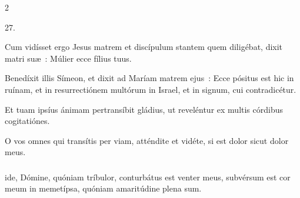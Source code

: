 \documentclass[9pt,twoside]{extarticle}
\begin{document}
\begin{multicols}{2}
{{\begin{tightlist}{}
\item {} 27.
\item {} Cum vidísset ergo Jesus matrem et discípulum stantem quem diligébat, dixit matri suæ~: Múlier ecce fílius tuus.
\item {} Benedíxit illis Símeon, et dixit ad Maríam matrem ejus~: Ecce pósitus est hic in ruínam, et in resurrectiónem multórum in Israel, et in signum, cui contradicétur.
\item {} Et tuam ipsíus ánimam pertransíbit gládius, ut reveléntur ex multis córdibus cogitatiónes.
\item {} O vos omnes qui transítis per viam, atténdite et vidéte, si est dolor sicut dolor meus.
\end{tightlist}

\subsubsection*{}
ide, Dómine, quóniam tríbulor, conturbátus est venter meus, subvérsum est cor meum in memetípsa, quóniam amaritúdine plena sum.

}}
\end{multicols}
\end{document}
